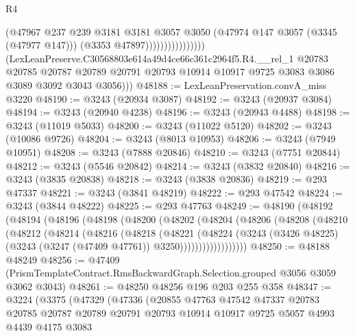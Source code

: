 \begin{lexlean}{R4}
\begin{coremodule}
                                    (@47967
                                      @237
                                      @239
                                      @3181
                                      @3181
                                      @3057
                                      @3050
                                      (@47974 @147 @3057 (@3345 (@47977 @147)))
                                      (@3353 @47897))))))))))))))))
        (LexLeanPreserve.C30568803e614a49d4ce66c361c2964f5.R4.__rel_1
          @20783
          @20785
          @20787
          @20789
          @20791
          @20793
          @10914
          @10917
          @9725
          @3083
          @3086
          @3089
          @3092
          @3043
          @3056)))
@48188 := LexLeanPreservation.convA_miss @3220
@48190 := @3243 (@20934 @3087)
@48192 := @3243 (@20937 @3084)
@48194 := @3243 (@20940 @4238)
@48196 := @3243 (@20943 @4488)
@48198 := @3243 (@11019 @5033)
@48200 := @3243 (@11022 @5120)
@48202 := @3243 (@10086 @9726)
@48204 := @3243 (@8013 @10953)
@48206 := @3243 (@7949 @10951)
@48208 := @3243 (@7888 @20846)
@48210 := @3243 (@7751 @20844)
@48212 := @3243 (@5546 @20842)
@48214 := @3243 (@3832 @20840)
@48216 := @3243 (@3835 @20838)
@48218 := @3243 (@3838 @20836)
@48219 := @293 @47337
@48221 := @3243 (@3841 @48219)
@48222 := @293 @47542
@48224 := @3243 (@3844 @48222)
@48225 := @293 @47763
@48249 := @48190
    (@48192
      (@48194
        (@48196
          (@48198
            (@48200
              (@48202
                (@48204
                  (@48206
                    (@48208
                      (@48210
                        (@48212
                          (@48214
                            (@48216
                              (@48218
                                (@48221
                                  (@48224
                                    (@3243
                                      (@3426 @48225)
                                      (@3243 (@3247 (@47409 @47761)) @3250))))))))))))))))))
@48250 := @48188 @48249
@48256 := @47409 (PrismTemplateContract.RmsBackwardGraph.Selection.grouped @3056 @3059 @3062 @3043)
@48261 := @48250 @48256 @196 @203 @255 @358
@48347 := @3224
    (@3375
      (@47329
        (@47336
          (@20855
            @47763
            @47542
            @47337
            @20783
            @20785
            @20787
            @20789
            @20791
            @20793
            @10914
            @10917
            @9725
            @5057
            @4993
            @4439
            @4175
            @3083

\end{coremodule}
\end{lexlean}
